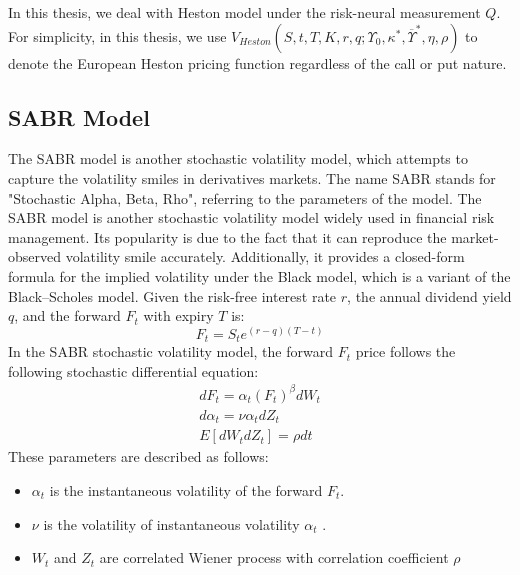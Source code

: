 \documentclass[letterpaper,12pt,titlepage,oneside,final]{book}
\numberwithin{equation}{section}
\theoremstyle{definition}
\begin{document}
In this thesis, we deal with Heston model under the risk-neural measurement $Q$. For simplicity, in this thesis,  we use $V_{Heston}(S,t,T,K,r,q;\Upsilon_0,\kappa^*,\overline{\Upsilon}^*,\eta,\rho)$ to denote the European Heston pricing function regardless of the call or put nature.
\subsection{SABR Model}
\label{sec:SABR}
The SABR model  \cite{hagan2002managing} is another stochastic volatility model, which attempts to capture the volatility smiles in derivatives markets. The name SABR stands for "Stochastic Alpha, Beta, Rho", referring to the parameters of the model.  The SABR model is another stochastic volatility model widely used in financial risk management. Its popularity is due to the fact that it can reproduce the market-observed volatility smile  accurately. Additionally,  it provides a closed-form
formula for the implied volatility under the Black model, which is a variant of the Black–Scholes model. 
Given the risk-free interest rate $r$, the annual dividend yield $q$, and the forward $F_t$ with expiry $T$ is: 
\[
F_t=S_t e^{(r-q) (T-t)}
\]
In the SABR stochastic volatility model, the  forward $F_t$ price follows the following stochastic differential equation:
\[
\begin{split}
dF_t=\alpha_t (F_t)^{\beta}dW_t\\
d\alpha_t=\mathbb{\nu} \alpha_t dZ_t\\
E[dW_tdZ_t]=\rho dt
\end{split}
\]
These parameters are described as follows:
\begin{itemize}
	\item $\alpha_t$ is the instantaneous  volatility of the forward $F_t$.
	\item $\nu$ is the   volatility of  instantaneous  volatility $\alpha_t$  .
	\item $W_t$ and $Z_t$ are correlated Wiener process with correlation coefficient $\rho$
\end{itemize}
\end{document}
